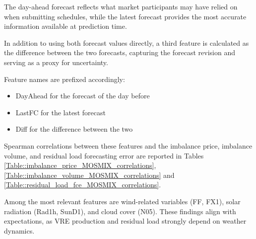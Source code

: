 \documentclass[class=scrbook, crop=false]{standalone}
\begin{document}
The day-ahead forecast reflects what market participants may have relied on when submitting schedules, while the latest forecast provides the most accurate information available at prediction time.

In addition to using both forecast values directly, a third feature is calculated as the difference between the two forecasts, capturing the forecast revision and serving as a proxy for uncertainty.

Feature names are prefixed accordingly:
\begin{itemize}
\item DayAhead for the forecast of the day before
\item LastFC for the latest forecast
\item Diff  for the difference between the two
\end{itemize}
Spearman correlations between these features and the imbalance price, imbalance volume, and residual load forecasting error are reported in Tables \ref{Table::imbalance_price_MOSMIX_correlations},  \ref{Table::imbalance_volume_MOSMIX_correlations} and  \ref{Table::residual_load_fce_MOSMIX_correlations}.

Among the most relevant features are wind-related variables (FF, FX1), solar radiation (Rad1h, SunD1), and cloud cover (N05). These findings align with expectations, as VRE production and residual load strongly depend on weather dynamics.




    
    
\end{document}
